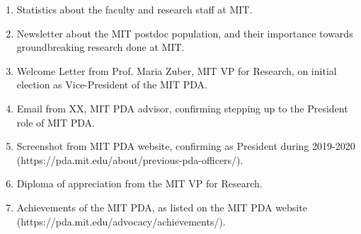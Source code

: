 \documentclass[11pt]{article}
\begin{document}
  

 
 


  \vspace{-7em}
  \begin{enumerate}
   \item Statistics about the faculty and research staff at MIT.
   \item Newsletter about the MIT postdoc population, and their importance towards groundbreaking research done at MIT.
   \item Welcome Letter from Prof. Maria Zuber, MIT VP for Research, on \drs initial election as Vice-President of the MIT PDA.
   \item Email from XX, MIT PDA advisor, confirming \dr stepping up to the President role of MIT PDA.
   \item Screenshot from MIT PDA website, confirming \dr as President during 2019-2020 (https://pda.mit.edu/about/previous-pda-officers/).
   \item Diploma of appreciation from the MIT VP for Research.
   \item Achievements of the MIT PDA, as listed on the MIT PDA website (https://pda.mit.edu/advocacy/achievements/).
  \end{enumerate}
\end{document}
